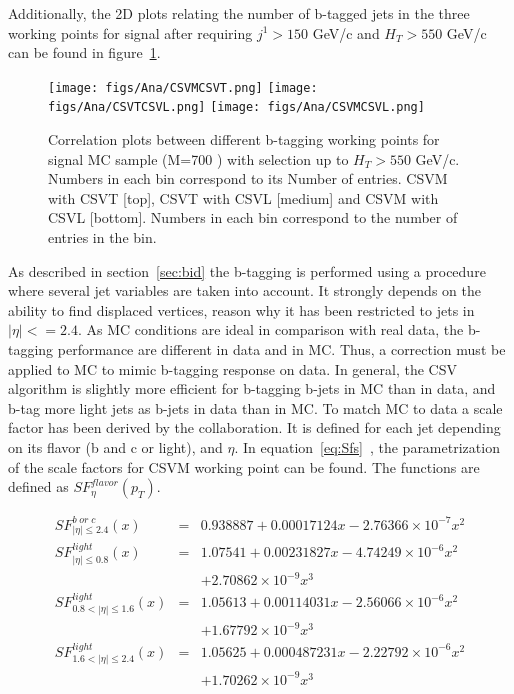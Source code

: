 Additionally, the 2D plots relating the number of b-tagged jets in the three working points for signal after requiring $j^{1}>150$ GeV/c and $H_{T}>550$ GeV/c can be found in figure~\ref{fig:WPcorr}.

\begin{figure}[!Hhtbp]
  \begin{center}
    \texttt{[image: figs/Ana/CSVMCSVT.png]}
    \texttt{[image: figs/Ana/CSVTCSVL.png]}
    \texttt{[image: figs/Ana/CSVMCSVL.png]}
    \caption{Correlation plots between different b-tagging working points for signal MC sample (M=700 \GeVcc) with selection up to $H_{T}>550$ GeV/c. Numbers in each bin correspond to its Number of entries. CSVM with CSVT [top], CSVT with CSVL [medium] and CSVM with CSVL [bottom]. Numbers in each bin correspond to the number of entries in the bin.}
    \label{fig:WPcorr}
  \end{center}
\end{figure}

As described in section~\ref{sec:bid} the b-tagging is performed using a procedure where several jet variables are taken into account. It strongly depends on the ability to find displaced vertices, reason why it has been restricted to jets in $|\eta|<=2.4$. As MC conditions are ideal in comparison with real data, the b-tagging performance are different in data and in MC. Thus, a correction must be applied to MC to mimic b-tagging response on data. In general, the CSV algorithm is slightly more efficient for b-tagging b-jets in MC than in data, and b-tag more light jets as b-jets in data than in MC. To match MC to data a scale factor has been derived by the collaboration. It is defined for each jet depending on its flavor (b and c or light), \pt and $\eta$. In equation~\ref{eq:Sfs}~\cite{CMS:2013vea}, the parametrization of the scale factors for CSVM working point can be found. The functions are defined as $SF^{flavor}_{\eta}(p_{T})$.

\begin{eqnarray}
  \label{eq:Sfs}
  SF^{b\; or\; c}_{|\eta|\le 2.4}(x) & = & 0.938887 + 0.00017124x - 2.76366 \times 10^{-7}x^{2} \nonumber \\
  SF^{light}_{|\eta|\le 0.8}(x) & = & 1.07541 + 0.00231827x - 4.74249 \times 10^{-6}x^{2}  \nonumber \\
  &  & +2.70862 \times 10^{-9}x^{3} \nonumber \\
  SF^{light}_{0.8 < |\eta|\le 1.6}(x) & = & 1.05613 + 0.00114031x - 2.56066 \times 10^{-6}x^{2} \nonumber \\
  &  & + 1.67792 \times 10^{-9}x^{3} \nonumber \\
  SF^{light}_{1.6 < |\eta|\le 2.4}(x) & = & 1.05625 + 0.000487231x - 2.22792 \times 10^{-6}x^{2} \nonumber \\
  &  & + 1.70262 \times 10^{-9}x^{3}
\end{eqnarray}

